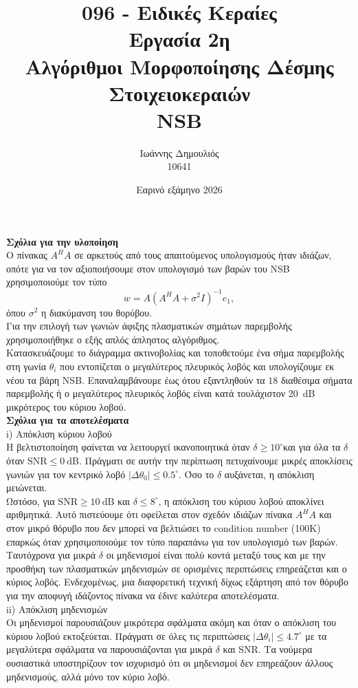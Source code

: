 \documentclass[12pt]{article} \usepackage{mathtools}
\title{\vspace{-2cm}096 - Ειδικές Κεραίες\\
    \large Εργασία 2η \\
    Αλγόριθμοι Μορφοποίησης Δέσμης Στοιχειοκεραιών \\
    NSB}
\author{Ιωάννης Δημουλιός \\ 10641}
\date{Εαρινό εξάμηνο 2026}
\begin{document}
\maketitle
\textbf{Σχόλια για την υλοποίηση}\\
Ο πίνακας $A^H A$ σε αρκετούς από τους απαιτούμενος υπολογισμούς ήταν ιδιάζων, οπότε για να τον αξιοποιήσουμε στον υπολογισμό των βαρών του NSB χρησιμοποιούμε τον τύπο
\[
w = A(A^H A + \sigma^2 I)^{-1} e_1
,\]
όπου $\sigma^2$ η διακύμανση του θορύβου. \\
Για την επιλογή των γωνιών άφιξης πλασματικών σημάτων παρεμβολής χρησιμοποιήθηκε ο εξής απλός άπληστος αλγόριθμος. \\
Κατασκευάζουμε το διάγραμμα ακτινοβολίας και τοποθετούμε ένα σήμα παρεμβολής στη γωνία $\theta_i$ που εντοπίζεται ο μεγαλύτερος πλευρικός λοβός και υπολογίζουμε εκ νέου τα βάρη NSB. Επαναλαμβάνουμε έως ότου εξαντληθούν τα $18$ διαθέσιμα σήματα παρεμβολής ή ο μεγαλύτερος πλευρικός λοβός είναι κατά τουλάχιστον \SI{20}{\dB} μικρότερος του κύριου λοβού. \\

\textbf{Σχόλια για τα αποτελέσματα} \\
i) Απόκλιση κύριου λοβού \\
Η βελτιστοποίηση φαίνεται να λειτουργεί ικανοποιητικά όταν $\delta \geq 10^\circ$και για όλα τα $\delta$ όταν $\text{SNR}\leq \SI{0}{\dB}$. Πράγματι σε αυτήν την περίπτωση πετυχαίνουμε μικρές αποκλίσεις γωνιών για τον κεντρικό λοβό $|\Delta\theta_0|\leq 0.5^\circ$. Όσο το $\delta$ αυξάνεται, η απόκλιση μειώνεται. \\
Ωστόσο, για $\text{SNR} \geq \SI{10}{\dB}$ και $\delta \leq 8^\circ$, η απόκλιση του κύριου λοβού αποκλίνει αριθμητικά. Αυτό πιστεύουμε ότι οφείλεται στον σχεδόν ιδιάζων πίνακα $A^H A$ και στον μικρό θόρυβο που δεν μπορεί να βελτιώσει το condition number (100K) επαρκώς όταν χρησιμοποιούμε τον τύπο παραπάνω για τον υπολογισμό των βαρών. Ταυτόχρονα για μικρά $\delta$ οι μηδενισμοί είναι πολύ κοντά μεταξύ τους και με την προσθήκη των πλασματικών μηδενισμών σε ορισμένες περιπτώσεις επηρεάζεται και ο κύριος λοβός. Ενδεχομένως, μια διαφορετική τεχνική δίχως εξάρτηση από τον θόρυβο για την αποφυγή ιδάζοντος πίνακα να έδινε καλύτερα αποτελέσματα. \\

ii) Απόκλιση μηδενισμών \\
Οι μηδενισμοί παρουσιάζουν μικρότερα σφάλματα ακόμη και όταν ο απόκλιση του κύριου λοβού εκτοξεύεται. Πράγματι σε όλες τις περιπτώσεις $|\Delta\theta_i| \leq 4.7^\circ$ με τα μεγαλύτερα σφάλματα να παρουσιάζονται για μικρά $\delta$ και SNR. Τα νούμερα ουσιαστικά υποστηρίζουν τον ισχυρισμό ότι οι μηδενισμοί δεν επηρεάζουν άλλους μηδενισμούς, αλλά μόνο τον κύριο λοβό. \\
\end{document}
